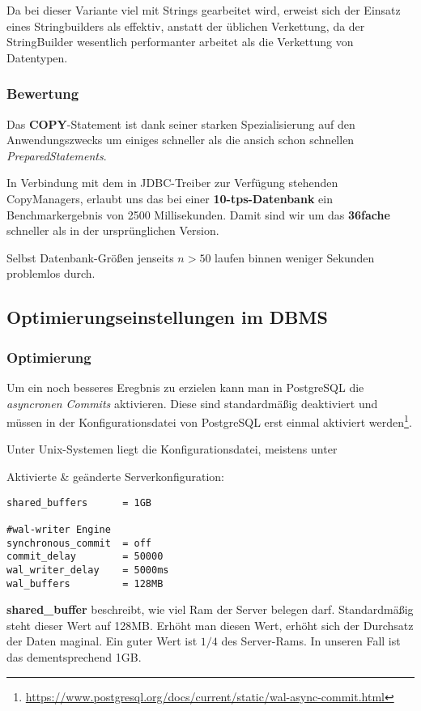Da bei dieser Variante viel mit Strings gearbeitet wird, erweist sich der Einsatz eines 
Stringbuilders als effektiv, anstatt der üblichen Verkettung, da der StringBuilder wesentlich 
performanter arbeitet als die Verkettung von Datentypen.

\subsubsection*{Bewertung}
Das \textbf{COPY}-Statement ist dank seiner starken Spezialisierung auf den
Anwendungszwecks um einiges schneller als die ansich schon schnellen
\textit{PreparedStatements}.

In Verbindung mit dem in JDBC-Treiber zur Verfügung stehenden CopyManagers,
erlaubt uns das bei einer \textbf{10-tps-Datenbank} ein Benchmarkergebnis von
2500 Millisekunden. Damit sind wir um das \textbf{36fache} schneller als in der
ursprünglichen Version.

Selbst Datenbank-Größen jenseits $n > 50$ laufen binnen weniger Sekunden
problemlos durch.
\clearpage


\subsection{Optimierungseinstellungen im DBMS}
\subsubsection*{Optimierung}
Um ein noch besseres Eregbnis zu erzielen kann man in PostgreSQL die
\textit{asyncronen Commits} aktivieren. Diese sind standardmäßig deaktiviert
und müssen in der Konfigurationsdatei von PostgreSQL erst einmal aktiviert
werden\footnote{\url{https://www.postgresql.org/docs/current/static/wal-async-commit.html}}.

Unter Unix-Systemen liegt die Konfigurationsdatei, meistens unter \newline
{}

Aktivierte \& geänderte Serverkonfiguration:
\begin{lstlisting}[title={Veränderte Serverkonfiguration}]
shared_buffers		= 1GB

#wal-writer Engine
synchronous_commit	= off
commit_delay		= 50000
wal_writer_delay	= 5000ms
wal_buffers			= 128MB
\end{lstlisting}

\textbf{shared\_buffer} beschreibt, wie viel Ram der Server belegen darf.
Standardmäßig steht dieser Wert auf 128MB. Erhöht man diesen Wert, erhöht
sich der Durchsatz der Daten maginal. Ein guter Wert ist $1/4$ des
Server-Rams. In unseren Fall ist das dementsprechend 1GB.


